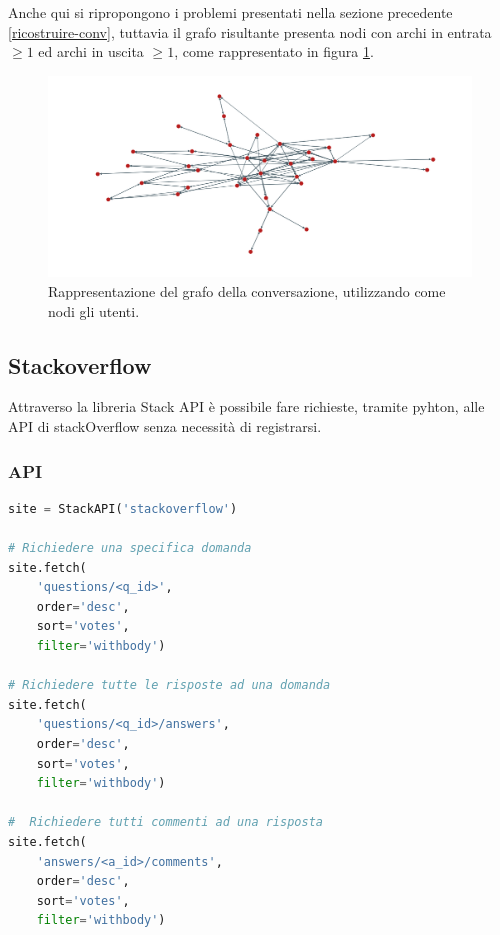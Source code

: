 Anche qui si ripropongono i problemi presentati nella sezione precedente \ref{ricostruire-conv}, tuttavia il grafo risultante presenta nodi con archi in entrata $\geq 1$ ed archi in uscita $\geq 1$, come rappresentato in figura \ref{fig:users-twitter}.

\begin{figure}[H]
    \includegraphics[width=\linewidth]{Immagini/twitter-users.png}
    \caption{Rappresentazione del grafo della conversazione, utilizzando come nodi gli utenti.}
    \label{fig:users-twitter}
\end{figure}





\subsection {Stackoverflow} %
Attraverso la libreria Stack API \cite{stackapi} è possibile fare richieste, tramite pyhton, alle API di stackOverflow senza necessità di registrarsi.

\subsubsection {API}

\begin{lstlisting}[language=Python, caption=Stack API in Python]
site = StackAPI('stackoverflow')

# Richiedere una specifica domanda
site.fetch(
    'questions/<q_id>', 
    order='desc', 
    sort='votes', 
    filter='withbody')
    
# Richiedere tutte le risposte ad una domanda
site.fetch(
    'questions/<q_id>/answers', 
    order='desc', 
    sort='votes', 
    filter='withbody')

#  Richiedere tutti commenti ad una risposta   
site.fetch(
    'answers/<a_id>/comments', 
    order='desc', 
    sort='votes', 
    filter='withbody')
\end{lstlisting}

